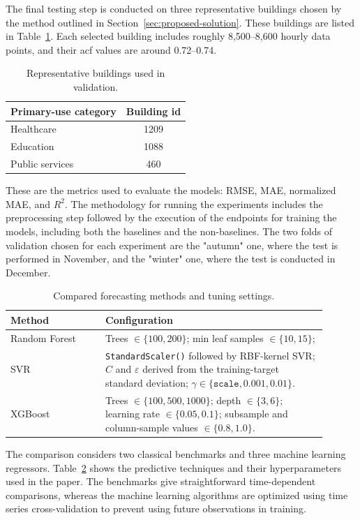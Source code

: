 \documentclass[conference]{IEEEtran}
\begin{document}
The final testing step is conducted on three representative buildings chosen by
the method outlined in Section~\ref{sec:proposed-solution}. These buildings are
listed in Table~\ref{tab:selected-buildings-paper}. Each selected building
includes roughly 8,500--8,600 hourly data points, and their acf values are around 0.72--0.74.

\begin{table}[H]
\centering
\caption{Representative buildings used in validation.}
\label{tab:selected-buildings-paper}
\begin{tabular}{lc}
\hline
\textbf{Primary-use category} & \textbf{Building id} \\
\hline
Healthcare & 1209 \\
Education & 1088 \\
Public services & 460 \\
\hline
\end{tabular}
\end{table}

These are the metrics used to evaluate the models: RMSE, MAE, normalized MAE, and $R^2$. The methodology for running the experiments includes the preprocessing step followed by the execution of the endpoints for training the models, including both the baselines and the non-baselines. The two folds of validation chosen for each experiment are the "autumn" one, where the test is performed in November, and the "winter" one, where the test is conducted in December.

\begin{table}[H]
\centering
\scriptsize
\caption{Compared forecasting methods and tuning settings.}
\label{tab:model-config-paper}
\begin{tabular}{p{0.27\linewidth}p{0.63\linewidth}}
\hline
\textbf{Method} & \textbf{Configuration} \\
\hline
Random Forest & Trees $\in \{100,200\}$; min leaf samples $\in \{10,15\}$;  \\
SVR & \texttt{StandardScaler()} followed by RBF-kernel SVR; $C$ and $\varepsilon$ derived from the training-target standard deviation; $\gamma \in \{\texttt{scale},0.001,0.01\}$. \\
XGBoost & Trees $\in \{100,500,1000\}$; depth $\in \{3,6\}$; learning rate $\in \{0.05,0.1\}$; subsample and column-sample values $\in \{0.8,1.0\}$. \\
\hline
\end{tabular}
\end{table}

The comparison considers two classical benchmarks and three machine learning regressors. Table~\ref{tab:model-config-paper} shows the predictive techniques and their hyperparameters used in the paper. The benchmarks give straightforward time-dependent comparisons, whereas the machine learning algorithms are optimized using time series cross-validation to prevent using future observations in training.
\end{document}
